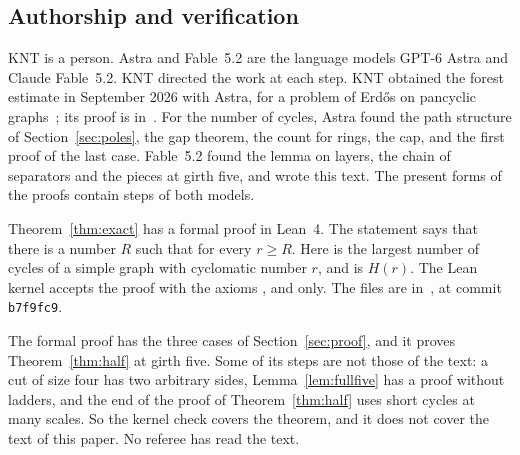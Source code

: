 \subsection{Authorship and verification}\label{sec:status}

KNT is a person. Astra and Fable~5.2 are the language models GPT-6 Astra and Claude Fable~5.2.
KNT directed the work at each step. KNT obtained the forest estimate in September 2026 with
Astra, for a problem of Erd\H{o}s on pancyclic graphs~\cite{KNT}; its proof is
in~\cite{Forest}. For the number of cycles, Astra found the path structure of
Section~\ref{sec:poles}, the gap theorem, the count for rings, the cap, and the first proof of
the last case. Fable~5.2 found the lemma on layers, the chain of separators and the pieces at
girth five, and wrote this text. The present forms of the proofs contain steps of both models.

Theorem~\ref{thm:exact} has a formal proof in Lean~4. The statement
 says that there is a number $R$ such that
 for every $r\ge R$. Here  is the largest number
of cycles of a simple graph with cyclomatic number $r$, and  is $H(r)$. The Lean
kernel accepts the proof with the axioms ,  and
 only. The files are in~\cite{Repo}, at commit \texttt{b7f9fc9}.

The formal proof has the three cases of Section~\ref{sec:proof}, and it proves
Theorem~\ref{thm:half} at girth five. Some of its steps are not those of the text: a cut of
size four has two arbitrary sides, Lemma~\ref{lem:fullfive} has a proof without ladders,
and the end of the proof of Theorem~\ref{thm:half} uses short cycles at many scales. So the
kernel check
covers the theorem, and it does not cover the text of this paper. No referee has read the text.
